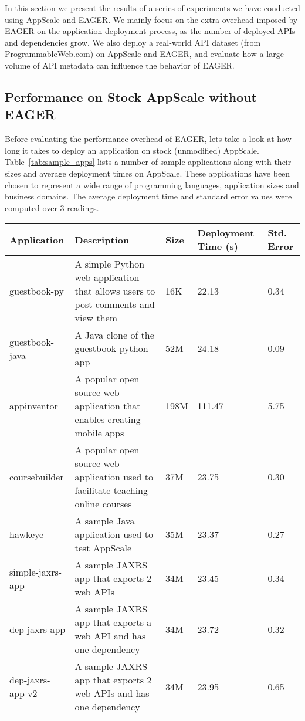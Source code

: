 In this section we present the results of a series of experiments we have conducted using AppScale and EAGER. We mainly focus
on the extra overhead imposed by EAGER on the application deployment process, as the number of deployed APIs and dependencies
grow. We also deploy a real-world API dataset (from ProgrammableWeb.com) on AppScale and EAGER, and evaluate how a large 
volume of API metadata can influence the behavior of EAGER.

\subsection{Performance on Stock AppScale without EAGER}
Before evaluating the performance overhead of EAGER, lets take a look at how long it takes to deploy an application on stock (unmodified)
AppScale. Table~\ref{tab:sample_apps} lists a number of sample applications along with their sizes and average deployment times on AppScale.
These applications have been chosen to represent a wide range of programming languages, application sizes and business domains. The average
deployment time and standard error values were computed over 3 readings.

\begin{table*}[ht]
\begin{center}
\begin{tabular}{| l | p{6cm} | l | l | l | }
\hline
Application & Description & Size & Deployment Time (s) & Std. Error\\ \hline
guestbook-py & A simple Python web application that allows users to post comments and view them & 16K & 22.13 & 0.34 \\ \hline
guestbook-java & A Java clone of the guestbook-python app & 52M & 24.18 & 0.09 \\ \hline
appinventor & A popular open source web application that enables creating mobile apps & 198M & 111.47 & 5.75 \\ \hline
coursebuilder & A popular open source web application used to facilitate teaching online courses & 37M & 23.75 & 0.30 \\ \hline
hawkeye & A sample Java application used to test AppScale & 35M & 23.37 & 0.27 \\ \hline
simple-jaxrs-app & A sample JAXRS app that exports 2 web APIs & 34M & 23.45 & 0.34 \\ \hline
dep-jaxrs-app & A sample JAXRS app that exports a web API and has one dependency & 34M & 23.72 & 0.32 \\ \hline
dep-jaxrs-app-v2 & A sample JAXRS app that exports 2 web APIs and has one dependency & 34M & 23.95 & 0.65 \\ \hline
\end{tabular}
\end{center}
\caption{Sample AppScale Applications}
\label{tab:sample_apps}
\end{table*}

